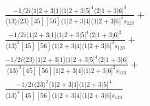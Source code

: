 \documentclass[varwidth, border=5pt]{standalone}
\begin{document}
\begin{my}
$\begin{gathered}
\scriptscriptstyle\frac{-1/2i⟨1|2+3|1]⟨1|2+3|5]^4⟨2|1+3|6]^3}{⟨13⟩⟨23⟩[45][56]⟨1|2+3|4]⟨1|2+3|6]^4s_{123}}+\\
\scriptscriptstyle\frac{-1/2i⟨1|2+3|1]⟨1|2+3|5]^4⟨2|1+3|6]^2}{⟨13⟩^2[45][56]⟨1|2+3|4]⟨1|2+3|6]^3s_{123}}+\\
\scriptscriptstyle\frac{-1/2i⟨23⟩⟨1|2+3|1]⟨1|2+3|5]^4⟨2|1+3|6]}{⟨13⟩^3[45][56]⟨1|2+3|4]⟨1|2+3|6]^2s_{123}}+\\
\scriptscriptstyle\frac{-1/2i⟨23⟩^2⟨1|2+3|1]⟨1|2+3|5]^4}{⟨13⟩^4[45][56]⟨1|2+3|4]⟨1|2+3|6]s_{123}}\phantom{+}
\end{gathered}$
\end{my}
\end{document}
